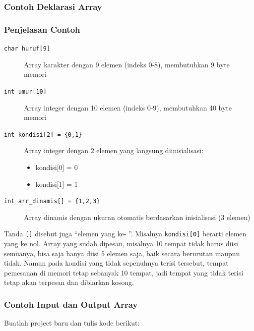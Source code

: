 \subsubsection{Contoh Deklarasi Array}



\subsubsection{Penjelasan Contoh}

\begin{description}
\item[\texttt{char huruf[9]}]
Array karakter dengan 9 elemen (indeks 0-8), membutuhkan 9 byte memori

\item[\texttt{int umur[10]}]
Array integer dengan 10 elemen (indeks 0-9), membutuhkan 40 byte memori

\item[\texttt{int kondisi[2] = \{0,1\}}]
Array integer dengan 2 elemen yang langsung diinisialisasi:
\begin{itemize}
\item kondisi[0] = 0
\item kondisi[1] = 1
\end{itemize}

\item[\texttt{int arr\_dinamis[] = \{1,2,3\}}]
Array dinamis dengan ukuran otomatis berdasarkan inisialisasi (3 elemen)
\end{description}

Tanda \texttt{{[}{]}} disebut juga ``elemen yang ke- ''. Misalnya
\texttt{kondisi{[}0{]}} berarti elemen yang ke nol. Array yang sudah
dipesan, misalnya 10 tempat tidak harus diisi semuanya, bisa saja hanya
diisi 5 elemen saja, baik secara berurutan maupun tidak. Namun pada
kondisi yang tidak sepenuhnya terisi tersebut, tempat pemesanan di
memori tetap sebanyak 10 tempat, jadi tempat yang tidak terisi tetap
akan terpesan dan dibiarkan kosong.

\subsubsection*{Contoh Input dan Output Array}

Buatlah project baru dan tulis kode berikut:



